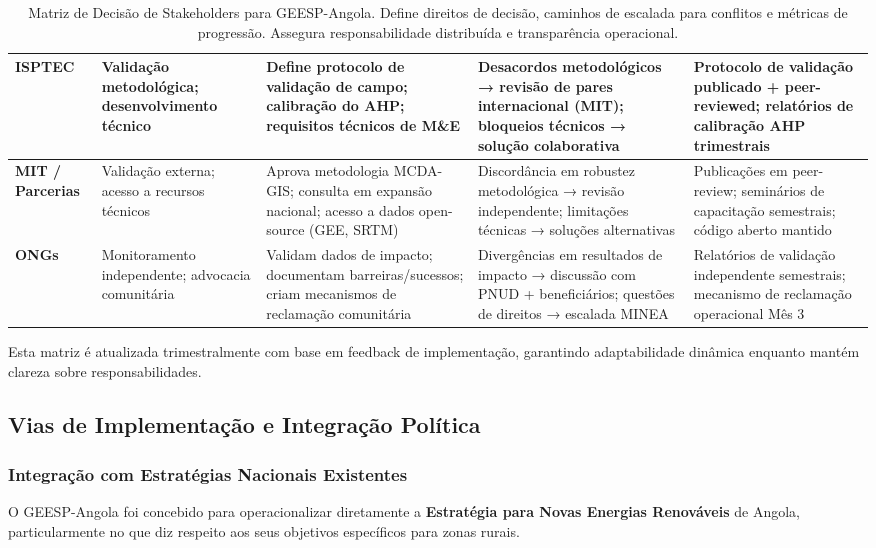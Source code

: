 \documentclass[12pt, a4paper]{article}
\begin{document}
\begin{itemize}
\begin{table}[h!]
\begin{tabular}{|l|l|l|l|l|}
\hline
\textbf{ISPTEC} & Validação metodológica; desenvolvimento técnico & Define protocolo de validação de campo; calibração do AHP; requisitos técnicos de M\&E & Desacordos metodológicos → revisão de pares internacional (MIT); bloqueios técnicos → solução colaborativa & Protocolo de validação publicado + peer-reviewed; relatórios de calibração AHP trimestrais \\
\hline
\textbf{MIT / Parcerias} & Validação externa; acesso a recursos técnicos & Aprova metodologia MCDA-GIS; consulta em expansão nacional; acesso a dados open-source (GEE, SRTM) & Discordância em robustez metodológica → revisão independente; limitações técnicas → soluções alternativas & Publicações em peer-review; seminários de capacitação semestrais; código aberto mantido \\
\hline
\textbf{ONGs} & Monitoramento independente; advocacia comunitária & Validam dados de impacto; documentam barreiras/sucessos; criam mecanismos de reclamação comunitária & Divergências em resultados de impacto → discussão com PNUD + beneficiários; questões de direitos → escalada MINEA & Relatórios de validação independente semestrais; mecanismo de reclamação operacional Mês 3 \\
\hline
\end{tabular}
\caption{Matriz de Decisão de Stakeholders para GEESP-Angola. Define direitos de decisão, caminhos de escalada para conflitos e métricas de progressão. Assegura responsabilidade distribuída e transparência operacional.}
\label{tab:stakeholder_decisions}
\end{table}

Esta matriz é atualizada trimestralmente com base em feedback de implementação, garantindo adaptabilidade dinâmica enquanto mantém clareza sobre responsabilidades.


\subsection{Vias de Implementação e Integração Política}

\subsubsection{Integração com Estratégias Nacionais Existentes}

O GEESP-Angola foi concebido para operacionalizar diretamente a \textbf{Estratégia para Novas Energias Renováveis} de Angola, particularmente no que diz respeito aos seus objetivos específicos para zonas rurais.


\end{itemize}
\end{document}
